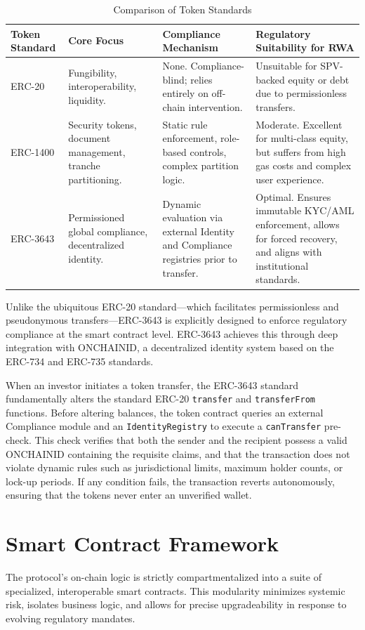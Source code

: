 \documentclass[12pt, a4paper]{article}
\begin{document}
\begin{table}[htbp]
\centering
\renewcommand{\arraystretch}{1.5}
\begin{tabularx}{\textwidth}{lXXX}
\toprule
\textbf{Token Standard} & \textbf{Core Focus} & \textbf{Compliance Mechanism} & \textbf{Regulatory Suitability for RWA} \\
\midrule
ERC-20 & Fungibility, interoperability, liquidity. & None. Compliance-blind; relies entirely on off-chain intervention. & Unsuitable for SPV-backed equity or debt due to permissionless transfers. \\
ERC-1400 & Security tokens, document management, tranche partitioning. & Static rule enforcement, role-based controls, complex partition logic. & Moderate. Excellent for multi-class equity, but suffers from high gas costs and complex user experience. \\
ERC-3643 & Permissioned global compliance, decentralized identity. & Dynamic evaluation via external Identity and Compliance registries prior to transfer. & Optimal. Ensures immutable KYC/AML enforcement, allows for forced recovery, and aligns with institutional standards. \\
\bottomrule
\end{tabularx}
\caption{Comparison of Token Standards}
\end{table}

Unlike the ubiquitous ERC-20 standard—which facilitates permissionless and pseudonymous transfers—ERC-3643 is explicitly designed to enforce regulatory compliance at the smart contract level. ERC-3643 achieves this through deep integration with ONCHAINID, a decentralized identity system based on the ERC-734 and ERC-735 standards.

When an investor initiates a token transfer, the ERC-3643 standard fundamentally alters the standard ERC-20 \texttt{transfer} and \texttt{transferFrom} functions. Before altering balances, the token contract queries an external Compliance module and an \texttt{IdentityRegistry} to execute a \texttt{canTransfer} pre-check. This check verifies that both the sender and the recipient possess a valid ONCHAINID containing the requisite claims, and that the transaction does not violate dynamic rules such as jurisdictional limits, maximum holder counts, or lock-up periods. If any condition fails, the transaction reverts autonomously, ensuring that the tokens never enter an unverified wallet.

\section{Smart Contract Framework}
The protocol's on-chain logic is strictly compartmentalized into a suite of specialized, interoperable smart contracts. This modularity minimizes systemic risk, isolates business logic, and allows for precise upgradeability in response to evolving regulatory mandates.
\end{document}
